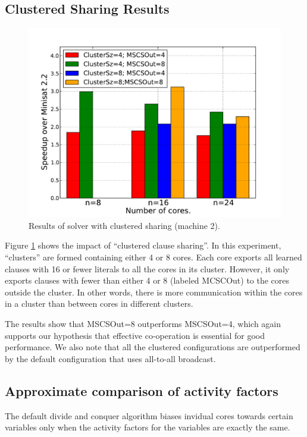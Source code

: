 \documentclass[letterpaper, compsoc, conference]{IEEEtran}
\begin{document}
\subsection{Clustered Sharing Results}
\begin{figure}[htbp]
  \includegraphics[width=\columnwidth]{images/cluster.pdf}
  \caption{Results of solver with clustered sharing (machine 2).}
  \label{fig:clusterres}
\end{figure}

Figure \ref{fig:clusterres} shows the impact of ``clustered clause sharing''. In
this experiment, ``clusters'' are formed containing either 4 or 8 cores. Each
core exports all learned clauses with 16 or fewer literals to all the cores in
its cluster. However, it only exports clauses with fewer than either 4 or 8
(labeled MCSCOut) to the cores outside the cluster. In other words, there is
more communication within the cores in a cluster than between cores in different
clusters.

The results show that MSCSOut=8 outperforms MSCSOut=4, which again supports our
hypothesis that effective co-operation is essential for good performance. We
also note that all the clustered configurations are outperformed by the default
configuration that uses all-to-all broadcast. 


\subsection{Approximate comparison of activity factors}
\label{sec:fuzzy activity}
The default divide and conquer algorithm biases invidual cores towards certain
variables only when the activity factors for the variables are exactly the same.
\end{document}
